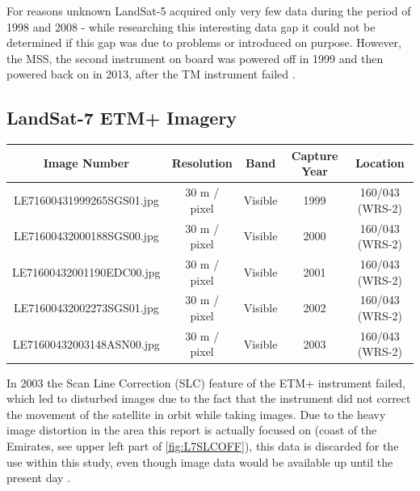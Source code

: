 For reasons unknown LandSat-5 acquired only very few data during the period of 1998 and 2008 - while researching this interesting data gap it could not be determined if this gap was due to problems or introduced on purpose. However, the MSS, the second instrument on board was powered off in 1999 and then powered back on in 2013, after the TM instrument failed \citep{l5:usgs}.

\subsection{LandSat-7 ETM+ Imagery}

\begin{table} [h!]
	\centering
	\begin{tabular}{| c | c | c | c | c |}
	\hline
	\textbf{Image Number} & \textbf{Resolution} & \textbf{Band} & \textbf{Capture Year} & \textbf{Location} \\ \hline
	LE71600431999265SGS01.jpg & 30 m / pixel& Visible & 1999 & 160/043 (WRS-2) \\ \hline 
	LE71600432000188SGS00.jpg & 30 m / pixel& Visible & 2000 & 160/043 (WRS-2) \\ \hline 
	LE71600432001190EDC00.jpg & 30 m / pixel& Visible & 2001 & 160/043 (WRS-2) \\ \hline 
	LE71600432002273SGS01.jpg & 30 m / pixel& Visible & 2002 & 160/043 (WRS-2) \\ \hline 
	LE71600432003148ASN00.jpg & 30 m / pixel& Visible & 2003 & 160/043 (WRS-2) \\ \hline 
	\end{tabular}
\end{table}

In 2003 the Scan Line Correction (SLC) feature of the ETM+ instrument failed, which led to disturbed images due to the fact that the instrument did not correct the movement of the satellite in orbit while taking images. Due to the heavy image distortion in the area this report is actually focused on (coast of the Emirates, see upper left part of \cref{fig:L7SLCOFF}), this data is discarded for the use within this study, even though image data would be available up until the present day \citep{l7:usgs}.



